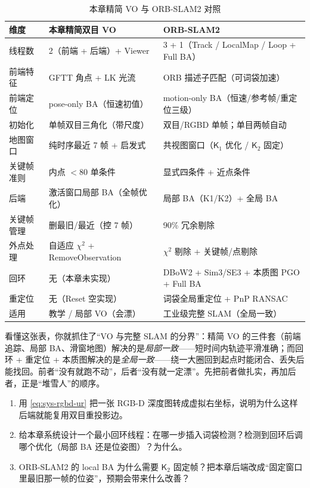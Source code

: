 \begin{table}[H]\centering\small
\caption{本章精简 VO 与 ORB-SLAM2 对照}
\label{tab:sys-orb-compare}
\begin{tabular}{lll}
\toprule
维度 & 本章精简双目 VO & ORB-SLAM2 \\
\midrule
线程数 & 2（前端 + 后端）+ Viewer & 3 + 1（Track / LocalMap / Loop + Full BA） \\
前端特征 & GFTT 角点 + LK 光流 & ORB 描述子匹配（可词袋加速） \\
前端定位 & pose-only BA（恒速初值） & motion-only BA（恒速/参考帧/重定位三级） \\
初始化 & 单帧双目三角化（带尺度） & 双目/RGBD 单帧；单目两帧自动 \\
地图窗口 & 纯时序最近 7 帧 + 启发式 & 共视图窗口（$\mathsf{K}_1$ 优化 / $\mathsf{K}_2$ 固定） \\
关键帧准则 & 内点 $<80$ 单条件 & 显式四条件 + 近点条件 \\
后端 & 激活窗口局部 BA（全帧优化） & 局部 BA（K1/K2）+ 全局 BA \\
关键帧管理 & 删最旧/最近（控 7 帧） & 90\% 冗余剔除 \\
外点处理 & 自适应 $\chi^2$ + RemoveObservation & $\chi^2$ 剔除 + 关键帧/点剔除 \\
回环 & 无（本章未实现） & DBoW2 + Sim3/SE3 + 本质图 PGO + Full BA \\
重定位 & 无（Reset 空实现） & 词袋全局重定位 + PnP RANSAC \\
适用 & 教学 / 局部 VO（会漂） & 工业级完整 SLAM（全局一致） \\
\bottomrule
\end{tabular}
\end{table}

\begin{insight}
看懂这张表，你就抓住了“VO 与完整 SLAM 的分界”：精简 VO 的三件套（前端追踪、局部 BA、滑窗地图）解决的是\emph{局部一致}——短时间内轨迹平滑准确；而回环 + 重定位 + 本质图解决的是\emph{全局一致}——绕一大圈回到起点时能闭合、丢失后能找回。前者“没有就跑不动”，后者“没有就一定漂”。先把前者做扎实，再加后者，正是“堆雪人”的顺序。
\end{insight}

\begin{practice}[练习]
\begin{enumerate}
  \item 用 \cref{eq:sys-rgbd-ur} 把一张 RGB-D 深度图转成虚拟右坐标，说明为什么这样后端就能复用双目重投影边。
  \item 给本章系统设计一个最小回环线程：在哪一步插入词袋检测？检测到回环后调哪个优化（局部 BA 还是位姿图）？为什么。
  \item ORB-SLAM2 的 local BA 为什么需要 $\mathsf{K}_2$ 固定帧？把本章后端改成“固定窗口里最旧那一帧的位姿”，预期会带来什么改善？
\end{enumerate}
\end{practice}

